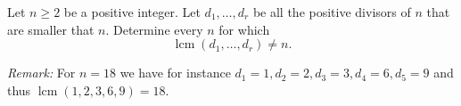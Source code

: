 Let $n\geq 2$ be a positive integer.
Let $d_1, \ldots, d_r$ be all the positive divisors of $n$ that are smaller that $n$.
Determine every $n$ for which
\[
    \operatorname{lcm}(d_1, \ldots, d_r) \neq n.
\]

\emph{Remark:} For $n=18$ we have for instance $d_1 = 1, d_2 = 2, d_3 = 3, d_4 = 6, d_5=9$ and
thus $\operatorname{lcm}(1,2,3,6,9) = 18$.
